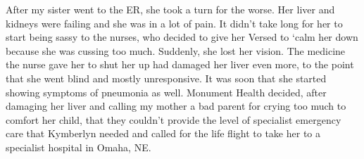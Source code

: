 \documentclass[12pt, letterpaper]{article}
\begin{document}
\begin{flushleft}
After my sister went to the ER, she took a turn for the worse.
Her liver and kidneys were failing and she was in a lot of pain.
It didn't take long for her to start being sassy to the nurses, 
who decided to give her Versed to `calm her down
because she was cussing too much.
Suddenly, she lost her vision.
The medicine the nurse gave her to shut her up had damaged her liver even more,
to the point that she went blind and mostly unresponsive.
It was soon that she started showing symptoms of pneumonia as well.
Monument Health decided, after damaging her liver and calling my mother
a bad parent for crying too much to comfort her child, that they couldn't 
provide the level of specialist emergency care that Kymberlyn needed and 
called for the life flight to take her to a specialist hospital in Omaha, NE\@.
\vspace{5mm}



\end{flushleft}
\end{document}
